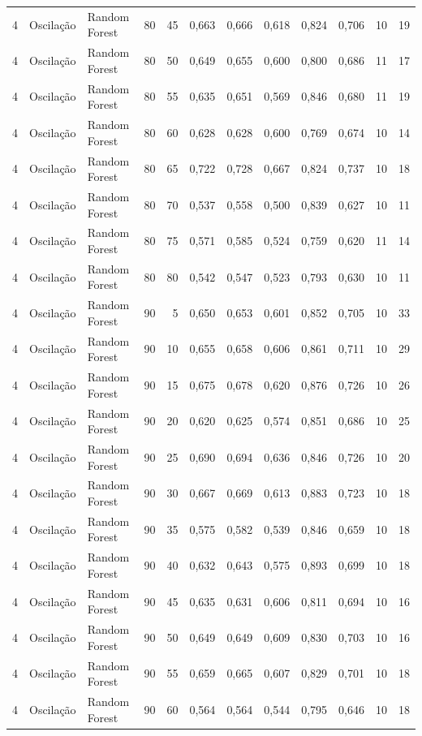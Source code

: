 \begin{longtable}{@{}rllrrrrrrrrr@{}}
4 & Oscilação & Random Forest & 80 & 45 & 0,663 & 0,666 & 0,618 & 0,824 & 0,706 & 10 & 19 \\
4 & Oscilação & Random Forest & 80 & 50 & 0,649 & 0,655 & 0,600 & 0,800 & 0,686 & 11 & 17 \\
4 & Oscilação & Random Forest & 80 & 55 & 0,635 & 0,651 & 0,569 & 0,846 & 0,680 & 11 & 19 \\
4 & Oscilação & Random Forest & 80 & 60 & 0,628 & 0,628 & 0,600 & 0,769 & 0,674 & 10 & 14 \\
4 & Oscilação & Random Forest & 80 & 65 & 0,722 & 0,728 & 0,667 & 0,824 & 0,737 & 10 & 18 \\
4 & Oscilação & Random Forest & 80 & 70 & 0,537 & 0,558 & 0,500 & 0,839 & 0,627 & 10 & 11 \\
4 & Oscilação & Random Forest & 80 & 75 & 0,571 & 0,585 & 0,524 & 0,759 & 0,620 & 11 & 14 \\
4 & Oscilação & Random Forest & 80 & 80 & 0,542 & 0,547 & 0,523 & 0,793 & 0,630 & 10 & 11 \\
4 & Oscilação & Random Forest & 90 & 5 & 0,650 & 0,653 & 0,601 & 0,852 & 0,705 & 10 & 33 \\
4 & Oscilação & Random Forest & 90 & 10 & 0,655 & 0,658 & 0,606 & 0,861 & 0,711 & 10 & 29 \\
4 & Oscilação & Random Forest & 90 & 15 & 0,675 & 0,678 & 0,620 & 0,876 & 0,726 & 10 & 26 \\
4 & Oscilação & Random Forest & 90 & 20 & 0,620 & 0,625 & 0,574 & 0,851 & 0,686 & 10 & 25 \\
4 & Oscilação & Random Forest & 90 & 25 & 0,690 & 0,694 & 0,636 & 0,846 & 0,726 & 10 & 20 \\
4 & Oscilação & Random Forest & 90 & 30 & 0,667 & 0,669 & 0,613 & 0,883 & 0,723 & 10 & 18 \\
4 & Oscilação & Random Forest & 90 & 35 & 0,575 & 0,582 & 0,539 & 0,846 & 0,659 & 10 & 18 \\
4 & Oscilação & Random Forest & 90 & 40 & 0,632 & 0,643 & 0,575 & 0,893 & 0,699 & 10 & 18 \\
4 & Oscilação & Random Forest & 90 & 45 & 0,635 & 0,631 & 0,606 & 0,811 & 0,694 & 10 & 16 \\
4 & Oscilação & Random Forest & 90 & 50 & 0,649 & 0,649 & 0,609 & 0,830 & 0,703 & 10 & 16 \\
4 & Oscilação & Random Forest & 90 & 55 & 0,659 & 0,665 & 0,607 & 0,829 & 0,701 & 10 & 18 \\
4 & Oscilação & Random Forest & 90 & 60 & 0,564 & 0,564 & 0,544 & 0,795 & 0,646 & 10 & 18 \\

\end{longtable}
